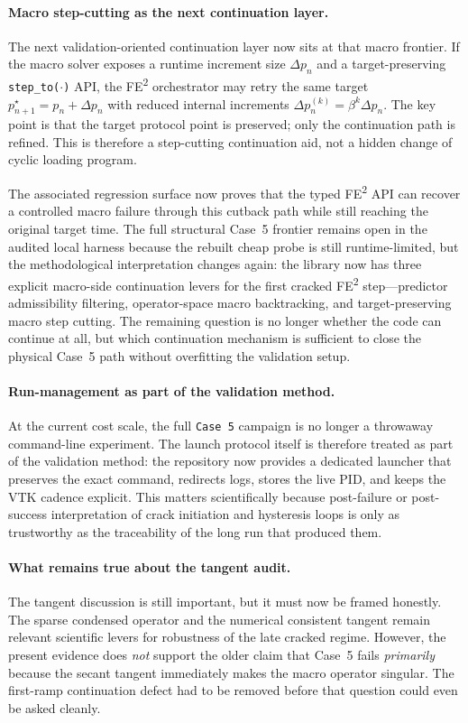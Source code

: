 \paragraph{Macro step-cutting as the next continuation layer.}
The next validation-oriented continuation layer now sits at that macro
frontier.  If the macro solver exposes a runtime increment size
\(\Delta p_n\) and a target-preserving \texttt{step\_to(\(\cdot\))} API, the
FE\textsuperscript{2} orchestrator may retry the same target
\(p_{n+1}^{\star} = p_n + \Delta p_n\) with reduced internal increments
\(\Delta p_n^{(k)} = \beta^k \Delta p_n\).  The key point is that the target
protocol point is preserved; only the continuation path is refined.  This is
therefore a step-cutting continuation aid, not a hidden change of cyclic
loading program.

The associated regression surface now proves that the typed FE\textsuperscript{2}
API can recover a controlled macro failure through this cutback path while
still reaching the original target time.  The full structural Case~5 frontier
remains open in the audited local harness because the rebuilt cheap probe is
still runtime-limited, but the methodological interpretation changes again:
the library now has three explicit macro-side continuation levers for the
first cracked FE\textsuperscript{2} step---predictor admissibility filtering,
operator-space macro backtracking, and target-preserving macro step cutting.
The remaining question is no longer whether the code can continue at all, but
which continuation mechanism is sufficient to close the physical Case~5 path
without overfitting the validation setup.

\paragraph{Run-management as part of the validation method.}
At the current cost scale, the full \texttt{Case~5} campaign is no longer a
throwaway command-line experiment.  The launch protocol itself is therefore
treated as part of the validation method: the repository now provides a
dedicated launcher that preserves the exact command, redirects logs, stores the
live PID, and keeps the VTK cadence explicit.  This matters scientifically
because post-failure or post-success interpretation of crack initiation and
hysteresis loops is only as trustworthy as the traceability of the long run
that produced them.

\paragraph{What remains true about the tangent audit.}
The tangent discussion is still important, but it must now be framed honestly.
The sparse condensed operator and the numerical consistent tangent remain
relevant scientific levers for robustness of the late cracked regime.
However, the present evidence does \emph{not} support the older claim that
Case~5 fails \emph{primarily} because the secant tangent immediately makes the
macro operator singular.  The first-ramp continuation defect had to be removed
before that question could even be asked cleanly.

